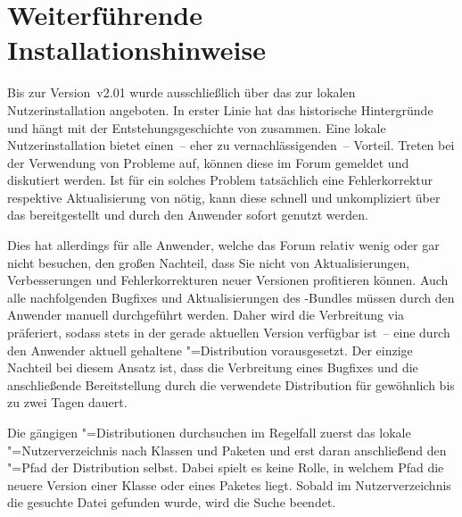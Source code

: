 \chapter{Weiterführende Installationshinweise}
%

\bigskip\noindent
Bis zur Version~v2.01 wurde \TUDScript ausschließlich über das \Forum zur 
lokalen Nutzerinstallation angeboten. In erster Linie hat das historische 
Hintergründe und hängt mit der Entstehungsgeschichte von \TUDScript zusammen. 
Eine lokale Nutzerinstallation bietet einen~-- eher zu vernachlässigenden~-- 
Vorteil. Treten bei der Verwendung von \TUDScript Probleme auf, können diese im 
Forum gemeldet und diskutiert werden. Ist für ein solches Problem tatsächlich 
eine Fehlerkorrektur respektive Aktualisierung von \TUDScript nötig, kann diese 
schnell und unkompliziert über das \GitHubRepo bereitgestellt und durch den 
Anwender sofort genutzt werden.

Dies hat allerdings für alle Anwender, welche das Forum relativ wenig oder gar 
nicht besuchen, den großen Nachteil, dass Sie nicht von Aktualisierungen, 
Verbesserungen und Fehlerkorrekturen neuer Versionen profitieren können. Auch 
alle nachfolgenden Bugfixes und Aktualisierungen des \TUDScript-Bundles müssen 
durch den Anwender manuell durchgeführt werden. Daher wird die Verbreitung via 
 präferiert, sodass \TUDScript stets in der gerade aktuellen 
Version verfügbar ist~-- eine durch den Anwender aktuell gehaltene 
"=Distribution vorausgesetzt. Der einzige Nachteil bei diesem 
Ansatz ist, dass die Verbreitung eines Bugfixes und die anschließende 
Bereitstellung durch die verwendete Distribution für gewöhnlich bis zu zwei 
Tagen dauert.

Die gängigen "=Distributionen durchsuchen im Regelfall zuerst das 
lokale "=Nutzerverzeichnis nach Klassen und Paketen und erst daran 
anschließend den "=Pfad der Distribution selbst. Dabei spielt es 
keine Rolle, in welchem Pfad die neuere Version einer Klasse oder eines Paketes 
liegt. Sobald im Nutzerverzeichnis die gesuchte Datei gefunden wurde, wird die 
Suche beendet.


